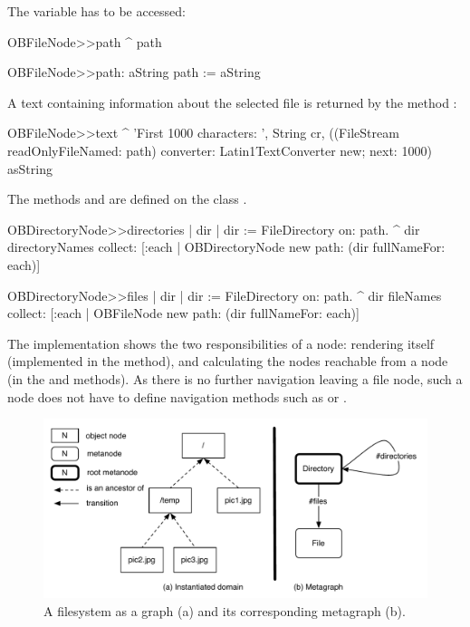 \documentclass[a4paper,10pt,twoside]{book}
\begin{document}
The variable  has to be accessed:

\begin{code}{}
OBFileNode>>path
     ^ path

OBFileNode>>path: aString
     path := aString
\end{code}

A text containing information about the selected file is returned by the method :

\begin{code}{}
OBFileNode>>text
     ^ 'First 1000 characters: ', String cr,
        ((FileStream readOnlyFileNamed: path) converter: Latin1TextConverter new; 
              next: 1000) asString
\end{code}

The methods  and  are defined on the class .

\begin{code}{}
OBDirectoryNode>>directories
     | dir | 
     dir := FileDirectory on: path.
     ^ dir directoryNames collect: [:each | 
                                  OBDirectoryNode new path: (dir fullNameFor: each)]

OBDirectoryNode>>files
     | dir | 
     dir := FileDirectory on:  path.
     ^ dir fileNames collect: [:each | 
                            OBFileNode new path: (dir fullNameFor: each)]
\end{code}

The implementation shows the two responsibilities of a node: rendering itself (implemented in the  method), and calculating the nodes reachable from a node (in the  and  methods). As there is no further navigation leaving a file node, such a node does not have to define navigation methods such as  or .

\begin{figure}[!ht]
\begin{center}
\includegraphics[scale=0.55]{metagraph-fs.pdf}
\caption{A filesystem as a graph (a) and its corresponding metagraph (b).} 
\end{center}
\end{figure}
\end{document}
